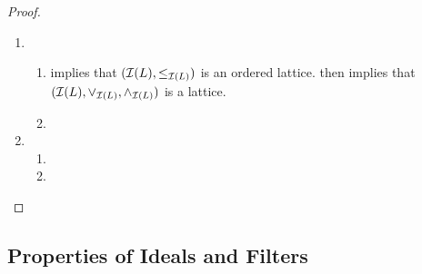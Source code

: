 \documentclass{book}
\begin{document}
	\begin{proof}\
		\begin{enumerate}
			\item 
			\begin{enumerate}
				\item {} implies that $(\mathcal{I}(L), \leq_{\mathcal{I}(L)})$ is an ordered lattice.  then implies that $(\mathcal{I}(L), \vee_{\mathcal{I}(L)}, \wedge_{\mathcal{I}(L)})$ is a lattice. 
				\item 
			\end{enumerate}
			\item 
			\begin{enumerate}
				\item {}
				\item 
			\end{enumerate}
		\end{enumerate}
	\end{proof}
	
	
	
	
	
	
	
	
	
	
	
	
	
	
	
	
	
	
	
	
	
	
	
	
	
	
	
	
	
	
	
	
	
	
	
	
	
	
	
	
	
	
	
	
	
	
	
	
	
	\subsection{Properties of Ideals and Filters}
	
\end{document}
